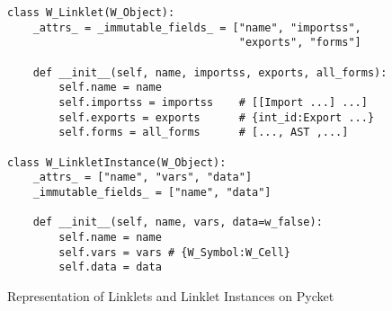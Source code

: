 \begin{figure}[!h]
  \centering
  \small
  \begin{minipage}{0.8\textwidth}
\begin{lstlisting}[style=python-style,numbers=none]
class W_Linklet(W_Object):
    _attrs_ = _immutable_fields_ = ["name", "importss",
                                    "exports", "forms"]

    def __init__(self, name, importss, exports, all_forms):
        self.name = name
        self.importss = importss    # [[Import ...] ...]
        self.exports = exports      # {int_id:Export ...}
        self.forms = all_forms      # [..., AST ,...]

class W_LinkletInstance(W_Object):
    _attrs_ = ["name", "vars", "data"]
    _immutable_fields_ = ["name", "data"]

    def __init__(self, name, vars, data=w_false):
        self.name = name
        self.vars = vars # {W_Symbol:W_Cell}
        self.data = data
\end{lstlisting}
  \end{minipage}
  \caption{Representation of Linklets and Linklet Instances on Pycket}
  \label{fig:pycket-linklet-representation}
\end{figure}
